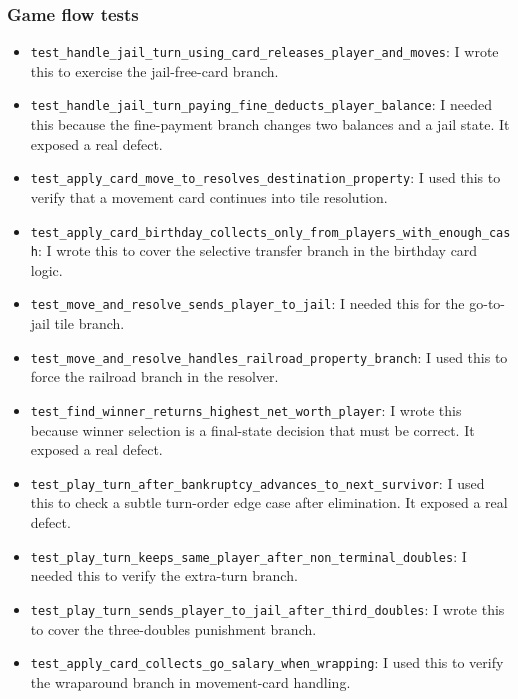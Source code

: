 \documentclass[12pt]{article}
\begin{document}
\subsubsection*{Game flow tests}
\begin{itemize}
  \item \texttt{test\_handle\_jail\_turn\_using\_card\_releases\_player\_and\_moves}: I wrote this to exercise the jail-free-card branch.
  \item \texttt{test\_handle\_jail\_turn\_paying\_fine\_deducts\_player\_balance}: I needed this because the fine-payment branch changes two balances and a jail state. It exposed a real defect.
  \item \texttt{test\_apply\_card\_move\_to\_resolves\_destination\_property}: I used this to verify that a movement card continues into tile resolution.
  \item \texttt{test\_apply\_card\_birthday\_collects\_only\_from\_players\_with\_enough\_cash}: I wrote this to cover the selective transfer branch in the birthday card logic.
  \item \texttt{test\_move\_and\_resolve\_sends\_player\_to\_jail}: I needed this for the go-to-jail tile branch.
  \item \texttt{test\_move\_and\_resolve\_handles\_railroad\_property\_branch}: I used this to force the railroad branch in the resolver.
  \item \texttt{test\_find\_winner\_returns\_highest\_net\_worth\_player}: I wrote this because winner selection is a final-state decision that must be correct. It exposed a real defect.
  \item \texttt{test\_play\_turn\_after\_bankruptcy\_advances\_to\_next\_survivor}: I used this to check a subtle turn-order edge case after elimination. It exposed a real defect.
  \item \texttt{test\_play\_turn\_keeps\_same\_player\_after\_non\_terminal\_doubles}: I needed this to verify the extra-turn branch.
  \item \texttt{test\_play\_turn\_sends\_player\_to\_jail\_after\_third\_doubles}: I wrote this to cover the three-doubles punishment branch.
  \item \texttt{test\_apply\_card\_collects\_go\_salary\_when\_wrapping}: I used this to verify the wraparound branch in movement-card handling.
\end{itemize}
\end{document}
